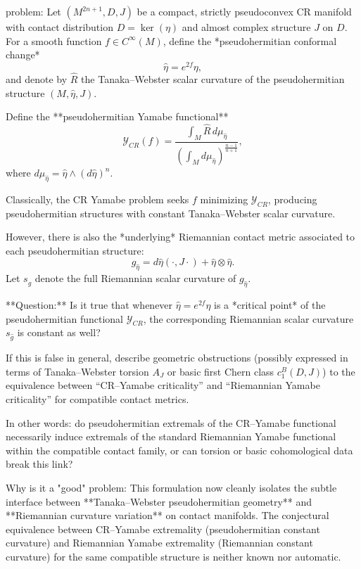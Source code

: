 problem:  
Let \((M^{2n+1}, D, J)\) be a compact, strictly pseudoconvex CR manifold with contact distribution \(D = \ker(\eta)\) and almost complex structure \(J\) on \(D\).  
For a smooth function \(f \in C^\infty(M)\), define the *pseudohermitian conformal change*
\[
\hat{\eta} = e^{2f}\eta,
\]
and denote by \(\hat{R}\) the Tanaka–Webster scalar curvature of the pseudohermitian structure \((M, \hat{\eta}, J)\).  

Define the **pseudohermitian Yamabe functional**
\[
\mathcal{Y}_{CR}(f) = \frac{\int_M \hat{R}\, d\mu_{\hat{\eta}}}{(\int_M d\mu_{\hat{\eta}})^{\frac{n-1}{n+1}}},
\]
where \(d\mu_{\hat{\eta}} = \hat{\eta} \wedge (d\hat{\eta})^n\).  

Classically, the CR Yamabe problem seeks \(f\) minimizing \(\mathcal{Y}_{CR}\), producing pseudohermitian structures with constant Tanaka–Webster scalar curvature.  

However, there is also the *underlying* Riemannian contact metric associated to each pseudohermitian structure:
\[
g_{\hat{\eta}} = d\hat{\eta}(\cdot, J\cdot) + \hat{\eta}\otimes\hat{\eta}.
\]
Let \(s_{\hat{g}}\) denote the full Riemannian scalar curvature of \(g_{\hat{\eta}}\).

**Question:**  
Is it true that whenever \(\hat{\eta}=e^{2f}\eta\) is a *critical point* of the pseudohermitian functional \(\mathcal{Y}_{CR}\), the corresponding Riemannian scalar curvature \(s_{\hat g}\) is constant as well?  

If this is false in general, describe geometric obstructions (possibly expressed in terms of Tanaka–Webster torsion \(A_J\) or basic first Chern class \(c_1^B(D,J)\)) to the equivalence between
“CR–Yamabe criticality” and “Riemannian Yamabe criticality” for compatible contact metrics.  

In other words: do pseudohermitian extremals of the CR–Yamabe functional necessarily induce extremals of the standard Riemannian Yamabe functional within the compatible contact family, or can torsion or basic cohomological data break this link?

Why is it a "good" problem:  
This formulation now cleanly isolates the subtle interface between **Tanaka–Webster pseudohermitian geometry** and **Riemannian curvature variation** on contact manifolds. The conjectural equivalence between CR–Yamabe extremality (pseudohermitian constant curvature) and Riemannian Yamabe extremality (Riemannian constant curvature) for the same compatible structure is neither known nor automatic.  

